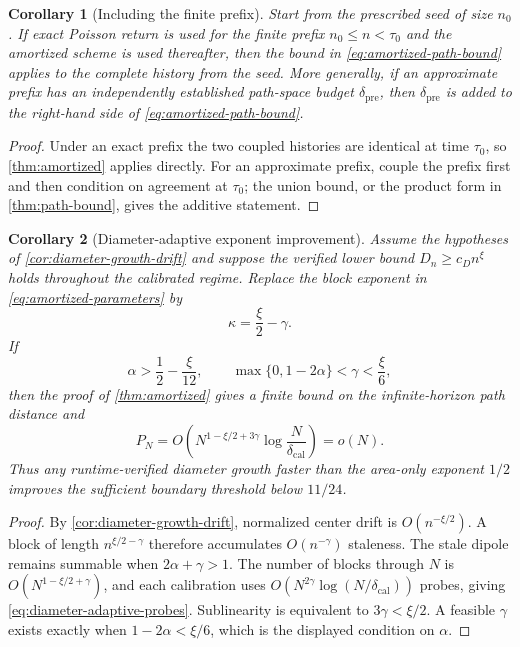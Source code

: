 \documentclass[11pt]{article}
\theoremstyle{mainthm}
\newtheorem{corollary}[corollary]{Corollary}
\theoremstyle{definition}
\theoremstyle{remark}
\begin{document}
\begin{corollary}[Including the finite prefix]
\label{cor:exact-prefix}
Start from the prescribed seed of size $n_0$. If exact Poisson return is used for the finite prefix $n_0\le n<\tau_0$ and the amortized scheme is used thereafter, then the bound in \eqref{eq:amortized-path-bound} applies to the complete history from the seed. More generally, if an approximate prefix has an independently established path-space budget $\delta_{\mathrm{pre}}$, then $\delta_{\mathrm{pre}}$ is added to the right-hand side of \eqref{eq:amortized-path-bound}.
\end{corollary}

\begin{proof}
Under an exact prefix the two coupled histories are identical at time $\tau_0$, so \cref{thm:amortized} applies directly. For an approximate prefix, couple the prefix first and then condition on agreement at $\tau_0$; the union bound, or the product form in \cref{thm:path-bound}, gives the additive statement.
\end{proof}

\begin{corollary}[Diameter-adaptive exponent improvement]
\label{cor:diameter-adaptive-amortization}
Assume the hypotheses of \cref{cor:diameter-growth-drift} and suppose the verified lower bound $D_n\ge c_Dn^\xi$ holds throughout the calibrated regime. Replace the block exponent in \eqref{eq:amortized-parameters} by
\[
  \kappa=\frac{\xi}{2}-\gamma.
\]
If
\[
  \alpha>\frac12-\frac{\xi}{12},
  \qquad
  \max\{0,1-2\alpha\}<\gamma<\frac{\xi}{6},
\]
then the proof of \cref{thm:amortized} gives a finite bound on the infinite-horizon path distance and
\begin{equation}
  P_N=O\!\left(
    N^{1-\xi/2+3\gamma}
    \log\frac{N}{\delta_{\mathrm{cal}}}
  \right)=o(N).
  \label{eq:diameter-adaptive-probes}
\end{equation}
Thus any runtime-verified diameter growth faster than the area-only exponent $1/2$ improves the sufficient boundary threshold below $11/24$.
\end{corollary}

\begin{proof}
By \cref{cor:diameter-growth-drift}, normalized center drift is
$O(n^{-\xi/2})$. A block of length $n^{\xi/2-\gamma}$ therefore accumulates $O(n^{-\gamma})$ staleness. The stale dipole remains summable when $2\alpha+\gamma>1$. The number of blocks through $N$ is $O(N^{1-\xi/2+\gamma})$, and each calibration uses $O(N^{2\gamma}\log(N/\delta_{\mathrm{cal}}))$ probes, giving \eqref{eq:diameter-adaptive-probes}. Sublinearity is equivalent to $3\gamma<\xi/2$. A feasible $\gamma$ exists exactly when $1-2\alpha<\xi/6$, which is the displayed condition on $\alpha$.
\end{proof}
\end{document}
